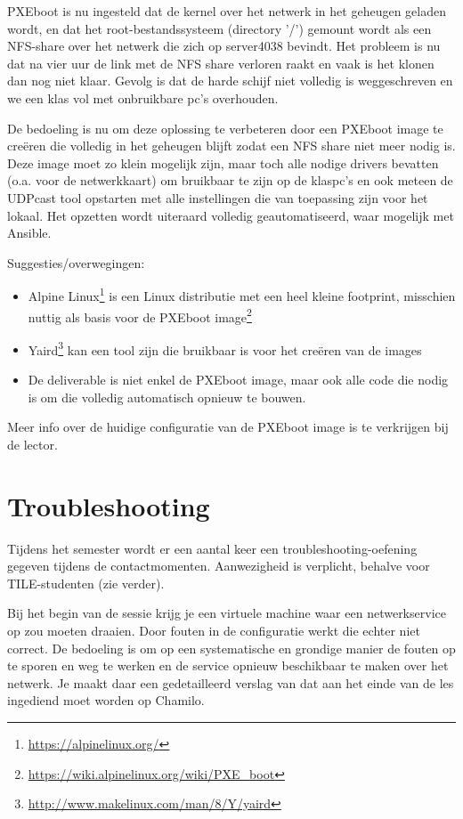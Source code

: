 PXEboot is nu ingesteld dat de kernel over het netwerk in het geheugen geladen wordt, en dat het root-bestandssysteem (directory '/') gemount wordt als een NFS-share over het netwerk die zich op server4038 bevindt. Het probleem is nu dat na vier uur de link met de NFS share verloren raakt en vaak is het klonen dan nog niet klaar. Gevolg is dat de harde schijf niet volledig is weggeschreven en we een klas vol met onbruikbare pc's overhouden.

De bedoeling is nu om deze oplossing te verbeteren door een PXEboot image te creëren die volledig in het geheugen blijft zodat een NFS share niet meer nodig is. Deze image moet zo klein mogelijk zijn, maar toch alle nodige drivers bevatten (o.a. voor de netwerkkaart) om bruikbaar te zijn op de klaspc's en ook meteen de UDPcast tool opstarten met alle instellingen die van toepassing zijn voor het lokaal. Het opzetten wordt uiteraard volledig geautomatiseerd, waar mogelijk met Ansible.

Suggesties/overwegingen:

\begin{itemize}
\item Alpine Linux\footnote{\url{https://alpinelinux.org/}} is een Linux distributie met een heel kleine footprint, misschien nuttig als basis voor de PXEboot image\footnote{\url{https://wiki.alpinelinux.org/wiki/PXE_boot}}
\item Yaird\footnote{\url{http://www.makelinux.com/man/8/Y/yaird}} kan een tool zijn die bruikbaar is voor het creëren van de images
\item De deliverable is niet enkel de PXEboot image, maar ook alle code die nodig is om die volledig automatisch opnieuw te bouwen.
\end{itemize}

Meer info over de huidige configuratie van de PXEboot image is te verkrijgen bij de lector.

\section{Troubleshooting}
\label{sec:troubleshooting}

Tijdens het semester wordt er een aantal keer een troubleshooting-oefening gegeven tijdens de contactmomenten. Aanwezigheid is verplicht, behalve voor TILE-studenten (zie verder).

Bij het begin van de sessie krijg je een virtuele machine waar een netwerkservice op zou moeten draaien. Door fouten in de configuratie werkt die echter niet correct. De bedoeling is om op een systematische en grondige manier de fouten op te sporen en weg te werken en de service opnieuw beschikbaar te maken over het netwerk. Je maakt daar een gedetailleerd verslag van dat aan het einde van de les ingediend moet worden op Chamilo.

